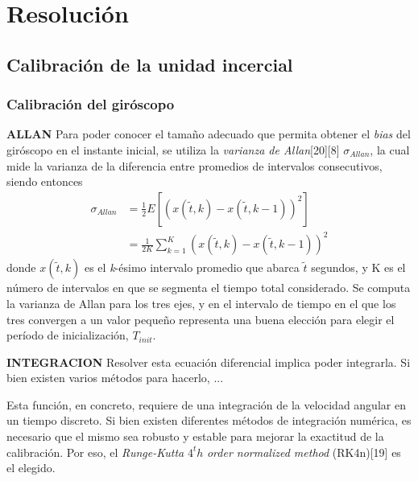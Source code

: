 \section{Resolución}
\subsection{Calibración de la unidad incercial}
\subsubsection{Calibración del giróscopo}
\textbf{ALLAN}
Para poder conocer el tamaño adecuado que permita obtener el \textit{bias} del giróscopo en el instante inicial, se utiliza la \textit{varianza de Allan}[20][8] $\sigma_{Allan}$, la cual mide la varianza de la diferencia entre promedios de intervalos consecutivos, siendo entonces
\begin{align}
    \sigma_{Allan} &= \frac{1}{2} E[(x(\tilde{t},k) - x(\tilde{t},k-1))^2] \\
    &= \frac{1}{2K}\sum_{k=1}^K(x(\tilde{t},k) - x(\tilde{t},k-1))^2
\end{align}
donde $x(\tilde{t},k)$ es el \textit{k}-ésimo intervalo promedio que abarca $\tilde{t}$ segundos, y K es el número de intervalos en que se segmenta el tiempo total considerado. Se computa la varianza de Allan para los tres ejes, y en el intervalo de tiempo en el que los tres convergen a un valor pequeño representa una buena elección para elegir el período de inicialización, $T_{init}$.

\textbf{INTEGRACION}
Resolver esta ecuación diferencial implica poder integrarla. Si bien existen varios métodos para hacerlo, ...


Esta función, en concreto, requiere de una integración de la velocidad angular en un tiempo discreto. Si bien existen diferentes métodos de integración numérica, es necesario que el mismo sea robusto y estable para mejorar la exactitud de la calibración. Por eso, el \textit{Runge-Kutta} $4^th$ \textit{order normalized method} (RK4n)[19] es el elegido.

